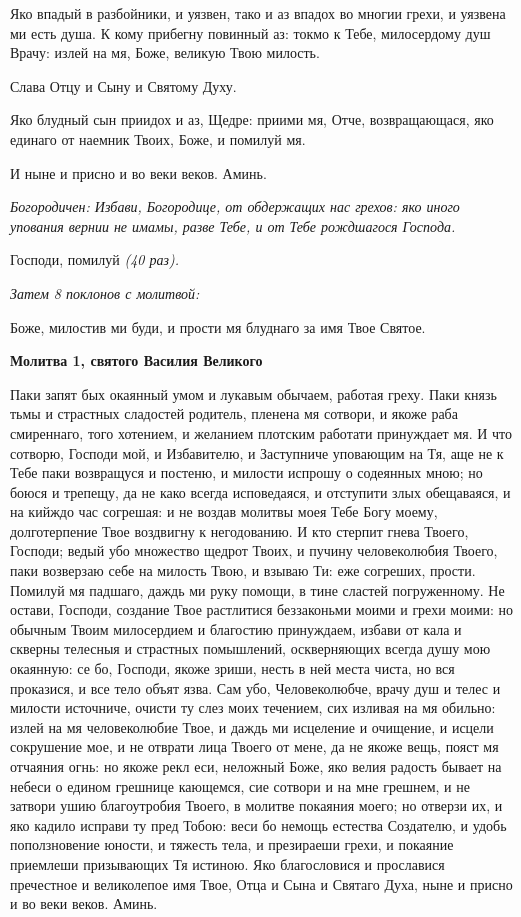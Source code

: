 Яко впадый в разбойники, и уязвен, тако и аз впадох во многии грехи, и уязвена ми есть душа. К кому прибегну повинный аз: токмо к Тебе, милосердому душ Врачу: излей на мя, Боже, великую Твою милость. 


Слава Отцу и Сыну и Святому Духу.


Яко блудный сын приидох и аз, Щедре: приими мя, Отче, возвращающася, яко единаго от наемник Твоих, Боже, и помилуй мя.


И ныне и присно и во веки веков. Аминь.


\itshape Богородичен:\normalfont{} Избави, Богородице, от обдержащих нас грехов: яко иного упования вернии не имамы, разве Тебе, и от Тебе рождшагося Господа.


Господи, помилуй \itshape (40 раз).\normalfont{}


\itshape Затем 8 поклонов с молитвой:\normalfont{} 


Боже, милостив ми буди, и прости мя блуднаго за имя Твое Святое.




\bfseries Молитва 1, святого Василия Великого\normalfont{}


Паки запят бых окаянный умом и лукавым обычаем, работая греху. Паки князь тьмы и страстных сладостей родитель, пленена мя сотвори, и якоже раба смиреннаго, того хотением, и желанием плотским работати принуждает мя. И что сотворю, Господи мой, и Избавителю, и Заступниче уповающим на Тя, аще не к Тебе паки возвращуся и постеню, и милости испрошу о содеянных мною; но боюся и трепещу, да не како всегда исповедаяся, и отступити злых обещаваяся, и на кийждо час согрешая: и не воздав молитвы моея Тебе Богу моему, долготерпение Твое воздвигну к негодованию. И кто стерпит гнева Твоего, Господи; ведый убо множество щедрот Твоих, и пучину человеколюбия Твоего, паки возверзаю себе на милость Твою, и взываю Ти: еже согреших, прости. Помилуй мя падшаго, даждь ми руку помощи, в тине сластей погруженному. Не остави, Господи, создание Твое растлитися беззаконьми моими и грехи моими: но обычным Твоим милосердием и благостию принуждаем, избави от кала и скверны телесныя и страстных помышлений, оскверняющих всегда душу мою окаянную: се бо, Господи, якоже зриши, несть в ней места чиста, но вся проказися, и все тело объят язва. Сам убо, Человеколюбче, врачу душ и телес и милости источниче, очисти ту слез моих течением, сих изливая на мя обильно: излей на мя человеколюбие Твое, и даждь ми исцеление и очищение, и исцели сокрушение мое, и не отврати лица Твоего от мене, да не якоже вещь, пояст мя отчаяния огнь: но якоже рекл еси, неложный Боже, яко велия радость бывает на небеси о едином грешнице кающемся, сие сотвори и на мне грешнем, и не затвори ушию благоутробия Твоего, в молитве покаяния моего; но отверзи их, и яко кадило исправи ту пред Тобою: веси бо немощь естества Создателю, и удобь поползновение юности, и тяжесть тела, и презираеши грехи, и покаяние приемлеши призывающих Тя истиною. Яко благословися и прославися пречестное и великолепое имя Твое, Отца и Сына и Святаго Духа, ныне и присно и во веки веков. Аминь.




